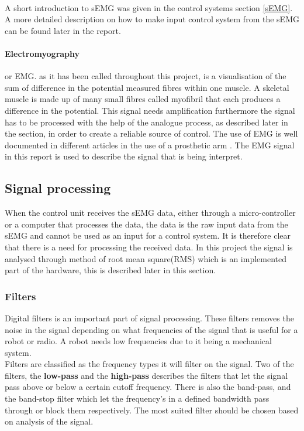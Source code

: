 \\

A short introduction to sEMG was given in the control systems section \ref{sEMG}. A more detailed description on how to make input control system from the sEMG can be found later in the report.

\paragraph{Electromyography} or EMG. as it has been called throughout this project, is a visualisation of the sum of difference in the potential measured fibres within one muscle. A skeletal muscle is made up of many small fibres called myofibril that each produces a difference in the potential. This signal needs amplification furthermore the signal has to be processed with the help of the analogue process, as described later in the section, in order to create a reliable source of control. The use of EMG is well documented in different articles in the use of a prosthetic arm  \cite{Castellini2009}. The EMG signal in this report is used to describe the signal that is being interpret.

\subsection*{Signal processing}
When the control unit receives the sEMG data, either through a micro-controller or a computer that processes the data, the data is the raw input data from the sEMG and cannot be used as an input for a control system. It is therefore clear that there is a need for processing the received data. In this project the signal is analysed through method of root mean square(RMS) which is an implemented part of the hardware, this is described later in this section.
\\ 

\subsubsection{Filters}
Digital filters is an important part of signal processing. 
These filters removes the noise in the signal depending on what frequencies of the signal that is useful for a robot or radio. A robot needs low frequencies due to it being a mechanical system.\\
Filters are classified as the frequency types it will filter on the signal. Two of the filters, the \textbf{low-pass} and the \textbf{high-pass} describes the filters that let the signal pass above or below a certain cutoff frequency. There is also the band-pass, and the band-stop filter which let the frequency's in a defined bandwidth pass through or block them respectively.
The most suited filter should be chosen based on analysis of the signal.

